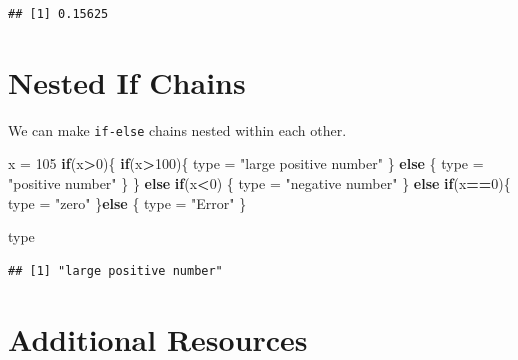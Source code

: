 \documentclass[
]{book}
\newenvironment{Shaded}{\begin{snugshade}}{\end{snugshade}}
\newcommand{\ControlFlowTok}[1]{\textcolor[rgb]{0.13,0.29,0.53}{\textbf{#1}}}
\newcommand{\DecValTok}[1]{\textcolor[rgb]{0.00,0.00,0.81}{#1}}
\newcommand{\NormalTok}[1]{#1}
\newcommand{\OperatorTok}[1]{\textcolor[rgb]{0.81,0.36,0.00}{\textbf{#1}}}
\newcommand{\StringTok}[1]{\textcolor[rgb]{0.31,0.60,0.02}{#1}}
\begin{document}
\begin{verbatim}
## [1] 0.15625
\end{verbatim}

\hypertarget{nested-if-chains}{%
\section{Nested If Chains}\label{nested-if-chains}}

We can make \texttt{if-else} chains nested within each other.

\begin{Shaded}
\begin{Highlighting}[]
\NormalTok{x =}\StringTok{ }\DecValTok{105}
\ControlFlowTok{if}\NormalTok{(x}\OperatorTok{>}\DecValTok{0}\NormalTok{)\{}
  \ControlFlowTok{if}\NormalTok{(x}\OperatorTok{>}\DecValTok{100}\NormalTok{)\{}
\NormalTok{     type =}\StringTok{ "large positive number"}
\NormalTok{  \} }\ControlFlowTok{else}\NormalTok{ \{}
\NormalTok{     type =}\StringTok{ "positive number"}
\NormalTok{  \}}
\NormalTok{\} }\ControlFlowTok{else} \ControlFlowTok{if}\NormalTok{(x}\OperatorTok{<}\DecValTok{0}\NormalTok{) \{}
\NormalTok{  type =}\StringTok{ "negative number"}
\NormalTok{\} }\ControlFlowTok{else} \ControlFlowTok{if}\NormalTok{(x}\OperatorTok{==}\DecValTok{0}\NormalTok{)\{}
\NormalTok{  type =}\StringTok{ "zero"}
\NormalTok{\}}\ControlFlowTok{else}\NormalTok{ \{}
\NormalTok{  type =}\StringTok{ "Error"}
\NormalTok{\}}

\NormalTok{type }
\end{Highlighting}
\end{Shaded}

\begin{verbatim}
## [1] "large positive number"
\end{verbatim}

\hypertarget{additional-resources-3}{%
\section{Additional Resources}\label{additional-resources-3}}
\end{document}
